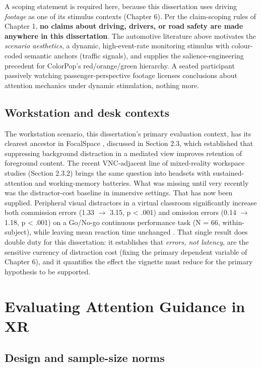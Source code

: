 A scoping statement is required here, because this dissertation uses driving \textit{footage} as one of its
stimulus contexts (Chapter 6). Per the claim-scoping rules of Chapter 1, \textbf{no claims about
driving, drivers, or road safety are made anywhere in this dissertation}. The
automotive literature above motivates the \textit{scenario aesthetics}, a dynamic, high-event-rate
monitoring stimulus with colour-coded semantic anchors (traffic signals), and supplies the
salience-engineering precedent for ColorPop's red/orange/green hierarchy. A seated participant
passively watching passenger-perspective footage licenses conclusions about attention mechanics
under dynamic stimulation, nothing more.

\subsection{Workstation and desk contexts}

The workstation scenario, this dissertation's primary evaluation context, has its clearest
ancestor in FocalSpace \citep{yao2013}, discussed in Section 2.3, which established that suppressing background
distraction in a mediated view improves retention of foreground content. The recent VNC-adjacent
line of mixed-reality workspace studies (Section 2.3.2) brings the same question into headsets with
sustained-attention and working-memory batteries. What was missing until very recently was the
distractor-cost baseline in immersive settings. That has now been supplied. Peripheral visual
distractors in a virtual classroom significantly increase both commission errors (1.33 $\rightarrow$ 3.15,
p < .001) and omission errors (0.14 $\rightarrow$ 1.18, p < .001) on a Go/No-go continuous performance task
(N = 66, within-subject), while leaving mean reaction time unchanged \citep{ai2025}. That single result
does double duty for this dissertation: it establishes that \textit{errors, not latency}, are the sensitive
currency of distraction cost (fixing the primary dependent variable of Chapter 6), and it quantifies
the effect the vignette must reduce for the primary hypothesis to be supported.

\section{Evaluating Attention Guidance in XR}

\subsection{Design and sample-size norms}

